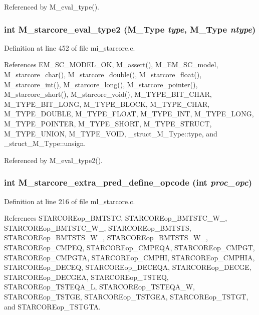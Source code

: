 Referenced by M\_\-eval\_\-type().
\subsubsection{\setlength{\rightskip}{0pt plus 5cm}int M\_\-starcore\_\-eval\_\-type2 (\bf{M\_\-Type} {\em type}, \bf{M\_\-Type} {\em ntype})}\label{m__starcore_8h_1dd66cb3919d37e019d84cc9e302ea76}




Definition at line 452 of file mi\_\-starcore.c.

References EM\_\-SC\_\-MODEL\_\-OK, M\_\-assert(), M\_\-EM\_\-SC\_\-model, M\_\-starcore\_\-char(), M\_\-starcore\_\-double(), M\_\-starcore\_\-float(), M\_\-starcore\_\-int(), M\_\-starcore\_\-long(), M\_\-starcore\_\-pointer(), M\_\-starcore\_\-short(), M\_\-starcore\_\-void(), M\_\-TYPE\_\-BIT\_\-CHAR, M\_\-TYPE\_\-BIT\_\-LONG, M\_\-TYPE\_\-BLOCK, M\_\-TYPE\_\-CHAR, M\_\-TYPE\_\-DOUBLE, M\_\-TYPE\_\-FLOAT, M\_\-TYPE\_\-INT, M\_\-TYPE\_\-LONG, M\_\-TYPE\_\-POINTER, M\_\-TYPE\_\-SHORT, M\_\-TYPE\_\-STRUCT, M\_\-TYPE\_\-UNION, M\_\-TYPE\_\-VOID, \_\-struct\_\-M\_\-Type::type, and \_\-struct\_\-M\_\-Type::unsign.

Referenced by M\_\-eval\_\-type2().
\subsubsection{\setlength{\rightskip}{0pt plus 5cm}int M\_\-starcore\_\-extra\_\-pred\_\-define\_\-opcode (int {\em proc\_\-opc})}\label{m__starcore_8h_970f61499ed782bf9be46107f30aa1e5}




Definition at line 216 of file ml\_\-starcore.c.

References STARCOREop\_\-BMTSTC, STARCOREop\_\-BMTSTC\_\-W\_, STARCOREop\_\-BMTSTC\_\-W\_, STARCOREop\_\-BMTSTS, STARCOREop\_\-BMTSTS\_\-W\_, STARCOREop\_\-BMTSTS\_\-W\_, STARCOREop\_\-CMPEQ, STARCOREop\_\-CMPEQA, STARCOREop\_\-CMPGT, STARCOREop\_\-CMPGTA, STARCOREop\_\-CMPHI, STARCOREop\_\-CMPHIA, STARCOREop\_\-DECEQ, STARCOREop\_\-DECEQA, STARCOREop\_\-DECGE, STARCOREop\_\-DECGEA, STARCOREop\_\-TSTEQ, STARCOREop\_\-TSTEQA\_\-L, STARCOREop\_\-TSTEQA\_\-W, STARCOREop\_\-TSTGE, STARCOREop\_\-TSTGEA, STARCOREop\_\-TSTGT, and STARCOREop\_\-TSTGTA.


